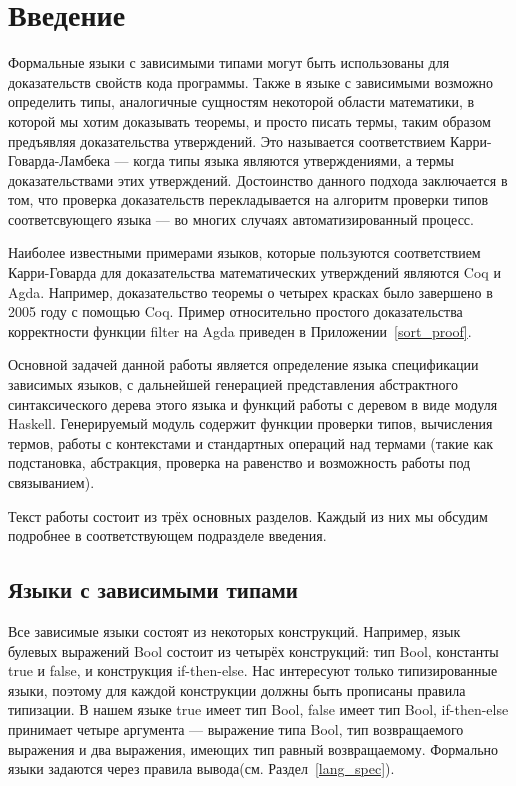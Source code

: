 \section*{Введение}
Формальные языки с зависимыми типами могут быть использованы для доказательств свойств кода программы. Также в языке с зависимыми возможно определить типы, аналогичные сущностям некоторой области математики, в которой мы хотим доказывать теоремы, и просто писать термы, таким образом предъявляя доказательства утверждений. Это называется соответствием Карри-Говарда-Ламбека\cite{curry_how} --- когда типы языка являются утверждениями, а термы доказательствами этих утверждений. Достоинство данного подхода заключается в том, что проверка доказательств перекладывается на алгоритм проверки типов соответсвующего языка --- во многих случаях автоматизированный процесс.

Наиболее известными примерами языков, которые пользуются соответствием Карри-Говарда для доказательства математических утверждений являются Coq\cite{coq} и Agda\cite{agda}. Например, доказательство теоремы о четырех красках было завершено в 2005 году с помощью Coq\cite{weisstein2002four}.
Пример относительно простого доказательства корректности функции filter на Agda приведен в Приложении~\ref{sort_proof}.

Основной задачей данной работы является определение языка спецификации зависимых языков, с дальнейшей генерацией представления абстрактного синтаксического дерева этого языка и функций работы с деревом в виде модуля Haskell\cite{haskell}. Генерируемый модуль содержит функции проверки типов, вычисления термов, работы с контекстами и стандартных операций над термами (такие как подстановка, абстракция, проверка на равенство и возможность работы под связыванием).

Текст работы состоит из трёх основных разделов. Каждый из них мы обсудим подробнее в соответствующем подразделе введения.

\subsection*{Языки с зависимыми типами}

Все зависимые языки состоят из некоторых конструкций. Например, язык булевых выражений Bool состоит из четырёх конструкций: тип Bool, константы true и false, и конструкция if-then-else. Нас интересуют только типизированные языки, поэтому для каждой конструкции должны быть прописаны правила типизации. В нашем языке true имеет тип Bool, false имеет тип Bool, if-then-else принимает четыре аргумента --- выражение типа Bool, тип возвращаемого выражения и два выражения, имеющих тип равный возвращаемому. Формально языки задаются через правила вывода(см. Раздел~\ref{lang_spec}).


